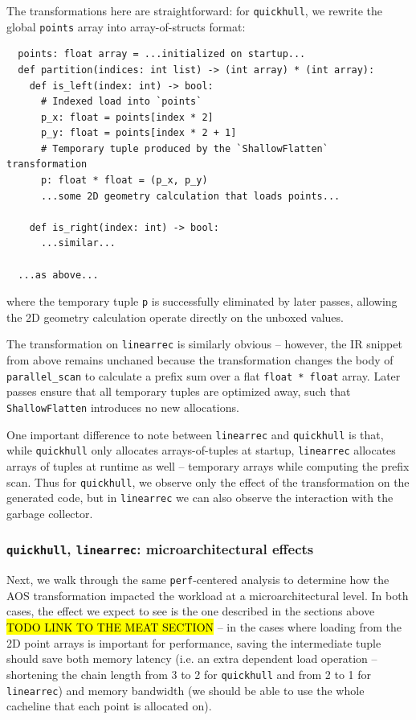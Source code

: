 \documentclass[leqno,11pt]{article}
\begin{document}
The transformations here are straightforward: for \texttt{quickhull}, we rewrite
the global \texttt{points} array into array-of-structs format:
\begin{verbatim}
  points: float array = ...initialized on startup...
  def partition(indices: int list) -> (int array) * (int array):
    def is_left(index: int) -> bool:
      # Indexed load into `points`
      p_x: float = points[index * 2]
      p_y: float = points[index * 2 + 1]
      # Temporary tuple produced by the `ShallowFlatten` transformation
      p: float * float = (p_x, p_y)
      ...some 2D geometry calculation that loads points...

    def is_right(index: int) -> bool:
      ...similar...

  ...as above...
\end{verbatim}
where the temporary tuple \texttt{p} is successfully eliminated by later passes,
allowing the 2D geometry calculation operate directly on the unboxed values.

The transformation on \texttt{linearrec} is similarly obvious -- however, the IR
snippet from above remains unchaned because the transformation changes the body
of \texttt{parallel\_scan} to calculate a prefix sum over a flat \texttt{float *
  float} array. Later passes ensure that all temporary tuples are optimized
away, such that \texttt{ShallowFlatten} introduces no new allocations.

One important difference to note between \texttt{linearrec} and
\texttt{quickhull} is that, while \texttt{quickhull} only allocates
arrays-of-tuples at startup, \texttt{linearrec} allocates arrays of tuples at
runtime as well -- temporary arrays while computing the prefix scan. Thus for
\texttt{quickhull}, we observe only the effect of the transformation on the
generated code, but in \texttt{linearrec} we can also observe the interaction
with the garbage collector.



\subsubsection{\texttt{quickhull}, \texttt{linearrec}: microarchitectural effects}
Next, we walk through the same \texttt{perf}-centered analysis to determine how
the AOS transformation impacted the workload at a microarchitectural level. In
both cases, the effect we expect to see is the one described in the sections
above \hl{TODO LINK TO THE MEAT SECTION} -- in the cases where loading from the
2D point arrays is important for performance, saving the intermediate tuple
should save both memory latency (i.e. an extra dependent load operation --
shortening the chain length from 3 to 2 for \texttt{quickhull} and from 2 to 1
for \texttt{linearrec}) and memory bandwidth (we should be able to use the whole
cacheline that each point is allocated on).
\end{document}
